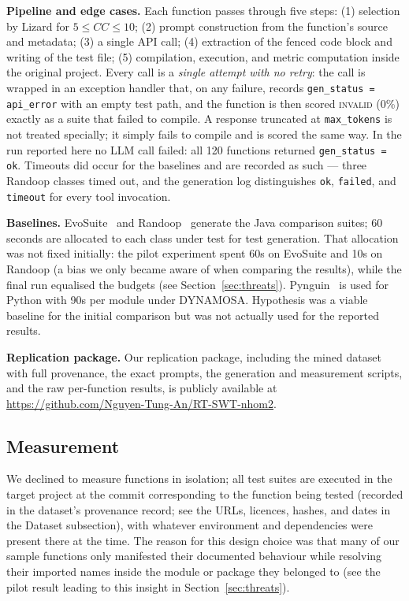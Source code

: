 \textbf{Pipeline and edge cases.} Each function passes through five steps: (1) selection by
Lizard for $5 \le CC \le 10$; (2) prompt construction from the function's source and
metadata; (3) a single API call; (4) extraction of the fenced code block and writing of the
test file; (5) compilation, execution, and metric computation inside the original project.
Every call is a \emph{single attempt with no retry}: the call is wrapped in an exception
handler that, on any failure, records \texttt{gen\_status = api\_error} with an empty test
path, and the function is then scored \textsc{invalid} (0\%) exactly as a suite that failed
to compile. A response truncated at \texttt{max\_tokens} is not treated specially; it simply
fails to compile and is scored the same way. In the run reported here no LLM call failed:
all 120 functions returned \texttt{gen\_status = ok}. Timeouts did occur for the baselines
and are recorded as such --- three Randoop classes timed out, and the generation log
distinguishes \texttt{ok}, \texttt{failed}, and \texttt{timeout} for every tool invocation.

\textbf{Baselines.} EvoSuite~\cite{fraser2011evosuite} and
Randoop~\cite{pacheco2007randoop} generate the Java comparison suites; 60 seconds are
allocated to each class under test for test generation. That allocation was not fixed
initially: the pilot experiment spent 60s on EvoSuite and 10s on Randoop (a bias we only
became aware of when comparing the results), while the final run equalised the budgets
(see Section~\ref{sec:threats}). Pynguin~\cite{lukasczyk2022pynguin} is used for Python
with 90s per module under DYNAMOSA. Hypothesis was a viable baseline for the initial
comparison but was not actually used for the reported results.

\textbf{Replication package.} Our replication package, including the mined dataset with full
provenance, the exact prompts, the generation and measurement scripts, and the raw
per-function results, is publicly available at
\url{https://github.com/Nguyen-Tung-An/RT-SWT-nhom2}.

\subsection{Measurement}
We declined to measure functions in isolation; all test suites are executed in the target
project at the commit corresponding to the function being tested (recorded in the
dataset's provenance record; see the URLs, licences, hashes, and dates in the Dataset
subsection), with whatever environment and dependencies were present there at the time.
The reason for this design choice was that many of our sample functions only manifested
their documented behaviour while resolving their imported names inside the module or
package they belonged to (see the pilot result leading to this insight in
Section~\ref{sec:threats}).

